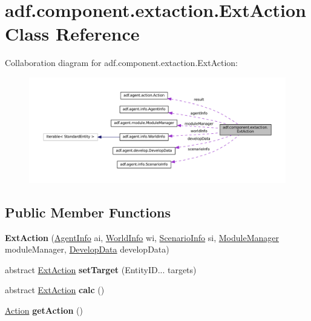 \hypertarget{classadf_1_1component_1_1extaction_1_1ExtAction}{}\section{adf.\+component.\+extaction.\+Ext\+Action Class Reference}
\label{classadf_1_1component_1_1extaction_1_1ExtAction}


Collaboration diagram for adf.\+component.\+extaction.\+Ext\+Action\+:
\nopagebreak
\begin{figure}[H]
\begin{center}
\leavevmode
\includegraphics[width=350pt]{classadf_1_1component_1_1extaction_1_1ExtAction__coll__graph}
\end{center}
\end{figure}
\subsection*{Public Member Functions}
\begin{DoxyCompactItemize}
\item 
\hypertarget{classadf_1_1component_1_1extaction_1_1ExtAction_a24f45e55bf8015b446ce66c62f2c3e04}{}\label{classadf_1_1component_1_1extaction_1_1ExtAction_a24f45e55bf8015b446ce66c62f2c3e04} 
{\bfseries Ext\+Action} (\hyperlink{classadf_1_1agent_1_1info_1_1AgentInfo}{Agent\+Info} ai, \hyperlink{classadf_1_1agent_1_1info_1_1WorldInfo}{World\+Info} wi, \hyperlink{classadf_1_1agent_1_1info_1_1ScenarioInfo}{Scenario\+Info} si, \hyperlink{classadf_1_1agent_1_1module_1_1ModuleManager}{Module\+Manager} module\+Manager, \hyperlink{classadf_1_1agent_1_1develop_1_1DevelopData}{Develop\+Data} develop\+Data)
\item 
\hypertarget{classadf_1_1component_1_1extaction_1_1ExtAction_a77ec92e848e5ac3daa7b4680c9860b9a}{}\label{classadf_1_1component_1_1extaction_1_1ExtAction_a77ec92e848e5ac3daa7b4680c9860b9a} 
abstract \hyperlink{classadf_1_1component_1_1extaction_1_1ExtAction}{Ext\+Action} {\bfseries set\+Target} (Entity\+I\+D... targets)
\item 
\hypertarget{classadf_1_1component_1_1extaction_1_1ExtAction_aa059b85523f542e5c78b9eae00351cca}{}\label{classadf_1_1component_1_1extaction_1_1ExtAction_aa059b85523f542e5c78b9eae00351cca} 
abstract \hyperlink{classadf_1_1component_1_1extaction_1_1ExtAction}{Ext\+Action} {\bfseries calc} ()
\item 
\hypertarget{classadf_1_1component_1_1extaction_1_1ExtAction_aaeeadcb73477a938f9461bfd123f8193}{}\label{classadf_1_1component_1_1extaction_1_1ExtAction_aaeeadcb73477a938f9461bfd123f8193} 
\hyperlink{classadf_1_1agent_1_1action_1_1Action}{Action} {\bfseries get\+Action} ()
\end{DoxyCompactItemize}
